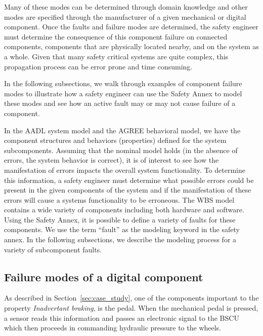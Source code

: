 Many of these modes can be determined through domain knowledge and other modes are specified through the manufacturer of a given mechanical or digital component. Once the faults and failure modes are determined, the safety engineer must determine the consequence of this component failure on connected components, components that are physically located nearby, and on the system as a whole. Given that many safety critical systems are quite complex, this propagation process can be error prone and time consuming.

In the following subsections, we walk through examples of component failure modes to illustrate how a safety engineer can use the Safety Annex to model these modes and see how an active fault may or may not cause failure of a component.


In the AADL system model and the AGREE behavioral model, we have the component structures and behaviors (properties) defined for the system subcomponents. Assuming that the nominal model holds (in the absence of errors, the system behavior is correct), it is of interest to see how the manifestation of errors impacts the overall system functionality. To determine this information, a safety engineer must determine what possible errors could be present in the given components of the system and if the manifestation of these errors will cause a systems functionality to be erroneous. The WBS model contains a wide variety of components including both hardware and software. Using the Safety Annex, it is possible to define a variety of faults for these components. We use the term ``fault'' as the modeling keyword in the safety annex. In the following subsections, we describe the modeling process for a variety of subcomponent faults.

\subsection{Failure modes of a digital component}

As described in Section~\ref{sec:case_study}, one of the components important to the property \textit{Inadvertant braking}, is the pedal. When the mechanical pedal is pressed, a sensor reads this information and passes an electronic signal to the BSCU which then proceeds in commanding hydraulic pressure to the wheels. 

